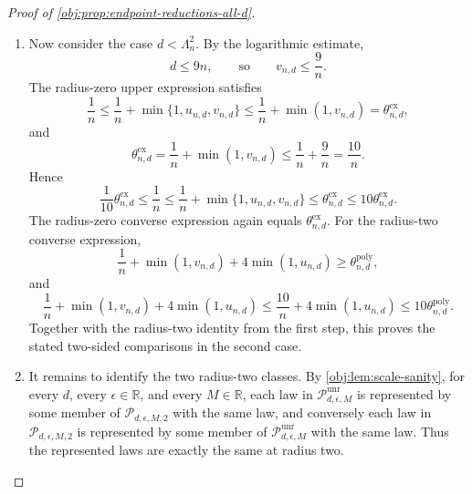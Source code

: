 \begin{proof}[Proof of \cref{obj:prop:endpoint-reductions-all-d}]
\begin{enumerate}
\item Now consider the case \(d<\Lambda_n^2\).  By the logarithmic estimate,
\[
d\le9n,
\qquad\text{so}\qquad
v_{n,d}\le\frac9n.
\]
The radius-zero upper expression satisfies
\[
\frac1n
\le
\frac1n+\min\{1,u_{n,d},v_{n,d}\}
\le
\frac1n+\min(1,v_{n,d})
=
\theta^{\mathrm{ex}}_{n,d},
\]
and
\[
\theta^{\mathrm{ex}}_{n,d}
=\frac1n+\min(1,v_{n,d})
\le
\frac1n+\frac9n
=
\frac{10}{n}.
\]
Hence
\[
\frac1{10}\theta^{\mathrm{ex}}_{n,d}
\le
\frac1n
\le
\frac1n+\min\{1,u_{n,d},v_{n,d}\}
\le
\theta^{\mathrm{ex}}_{n,d}
\le
10\theta^{\mathrm{ex}}_{n,d}.
\]
The radius-zero converse expression again equals \(\theta^{\mathrm{ex}}_{n,d}\).  For the
radius-two converse expression,
\[
\frac1n+\min(1,v_{n,d})+4\min(1,u_{n,d})
\ge
\theta^{\mathrm{poly}}_{n,d},
\]
and
\[
\frac1n+\min(1,v_{n,d})+4\min(1,u_{n,d})
\le
\frac{10}{n}+4\min(1,u_{n,d})
\le
10\theta^{\mathrm{poly}}_{n,d}.
\]
Together with the radius-two identity from the first step, this proves the stated
two-sided comparisons in the second case.

\item It remains to identify the two radius-two classes.  By \cref{obj:lem:scale-sanity}, for
every \(d\), every \(\epsilon\in\mathbb R\), and every \(M\in\mathbb R\), each law in
\(\mathcal P_{d,\epsilon,M}^{\mathrm{unr}}\) is represented by some member of
\(\mathcal P_{d,\epsilon,M,2}\) with the same law, and conversely each law in
\(\mathcal P_{d,\epsilon,M,2}\) is represented by some member of
\(\mathcal P_{d,\epsilon,M}^{\mathrm{unr}}\) with the same law.  Thus the represented laws are
exactly the same at radius two.
\end{enumerate}
\end{proof}

